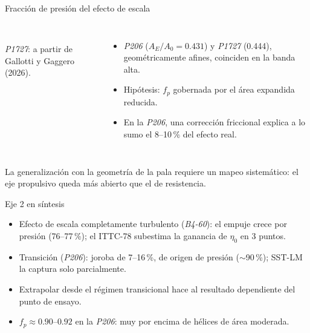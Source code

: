 \documentclass[aspectratio=169,10pt]{beamer}
\newcommand{\mensaje}[1]{\par\vfill\begin{msgbox}\small #1\end{msgbox}}
\newcommand{\fuente}[1]{{\tiny\color{gris}#1}}
\newcommand{\Bfs}{\textit{B4-60}}
\newcommand{\Pdos}{\textit{P206}}
\begin{document}
\begin{frame}{Fracción de presión del efecto de escala}
\begin{columns}[c]
  \centering
  \\
  \fuente{\textit{P1727}: a partir de Gallotti y Gaggero (2026).}
  \begin{itemize}\small
    \item \Pdos{} ($A_E/A_0 = 0.431$) y \textit{P1727} (0.444), geométricamente afines, coinciden en la banda alta.
    \item Hipótesis: $f_p$ gobernada por el \alert{área expandida reducida}.
    \item En la \Pdos, una corrección friccional explica a lo sumo el \alert{8–10\,\%} del efecto real.
  \end{itemize}
\end{columns}
\mensaje{La generalización con la geometría de la pala requiere un mapeo sistemático: el eje propulsivo queda más abierto que el de resistencia.}
\end{frame}

\begin{frame}{Eje 2 en síntesis}
\begin{itemize}
  \item Efecto de escala completamente turbulento (\Bfs): el empuje crece por \alert{presión} (76–77\,\%); el ITTC-78 subestima la ganancia de $\eta_0$ en 3 puntos.
  \item Transición (\Pdos): joroba de 7–16\,\%, \alert{de origen de presión} ($\sim$90\,\%); SST-LM la captura solo parcialmente.
  \item Extrapolar desde el régimen transicional hace al resultado \alert{dependiente del punto de ensayo}.
  \item $f_p \approx 0.90$–$0.92$ en la \Pdos: muy por encima de hélices de área moderada.
\end{itemize}
\end{frame}
\end{document}
